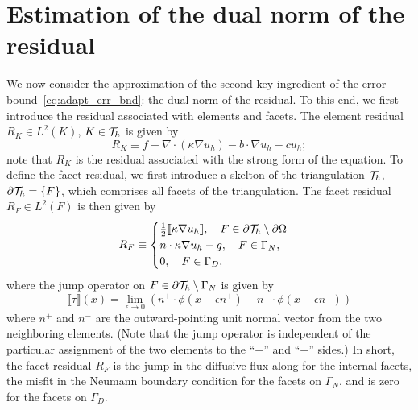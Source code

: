 \section{Estimation of the dual norm of the residual}
\label{sec:adapt_res_est}
We now consider the approximation of the second key ingredient of the error bound~\eqref{eq:adapt_err_bnd}: the dual norm of the residual. To this end, we first introduce the residual associated with elements and facets.  The element residual $R_K \in L^2(K)$, $K \in \mathcal{T}_h$ is given by
\begin{equation}
  R_K \equiv f + \nabla \cdot( \kappa \nabla u_h) - b \cdot \nabla u_h - c u_h ;
  \label{eq:adapt_RK}
\end{equation}
note that $R_K$ is the residual associated with the strong form of the equation.  To define the facet residual, we first introduce a skelton of the triangulation $\mathcal{T}_h$, $\partial \mathcal{T}_h = \{ F \}$, which comprises all facets of the triangulation. The facet residual $R_F \in L^2(F)$ is then given by
\begin{equation}
  R_F \equiv
  \begin{cases}
    \frac{1}{2} \llbracket \kappa \nabla u_h \rrbracket, \quad F \in \partial \mathcal{T}_h \setminus \partial \Omega \\
    n \cdot \kappa \nabla u_h - g,  \quad F \in \Gamma_N, \\
    0, \quad F \in \Gamma_D,
  \end{cases}
  \label{eq:adapt_RF}
\end{equation}
where the jump operator on $F \in \partial \mathcal{T}_h \setminus \Gamma_N$ is given by
\begin{equation*}
  \llbracket \tau \rrbracket (x)
  = \lim_{\epsilon \to 0} (n^+ \cdot \phi(x - \epsilon n^+)  +  n^- \cdot\phi(x - \epsilon n^-))
\end{equation*}
where $n^+$ and $n^-$ are the outward-pointing unit normal vector from the two neighboring elements.  (Note that the jump operator is independent of the particular assignment of the two elements to the ``$+$'' and ``$-$'' sides.) In short, the facet residual $R_F$ is the jump in the diffusive flux along for the internal facets, the misfit in the Neumann boundary condition for the facets on $\Gamma_N$, and is zero for the facets on $\Gamma_D$.


